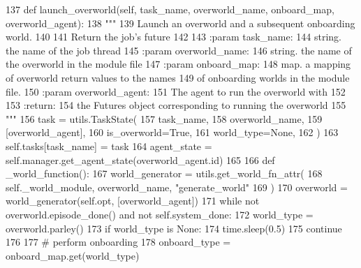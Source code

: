 \begin{DoxyCode}
137     \textcolor{keyword}{def }launch\_overworld(self, task\_name, overworld\_name, onboard\_map, overworld\_agent):
138         \textcolor{stringliteral}{"""}
139 \textcolor{stringliteral}{        Launch an overworld and a subsequent onboarding world.}
140 \textcolor{stringliteral}{}
141 \textcolor{stringliteral}{        Return the job's future}
142 \textcolor{stringliteral}{}
143 \textcolor{stringliteral}{        :param task\_name:}
144 \textcolor{stringliteral}{            string. the name of the job thread}
145 \textcolor{stringliteral}{        :param overworld\_name:}
146 \textcolor{stringliteral}{            string. the name of the overworld in the module file}
147 \textcolor{stringliteral}{        :param onboard\_map:}
148 \textcolor{stringliteral}{            map. a mapping of overworld return values to the names}
149 \textcolor{stringliteral}{            of onboarding worlds in the module file.}
150 \textcolor{stringliteral}{        :param overworld\_agent:}
151 \textcolor{stringliteral}{            The agent to run the overworld with}
152 \textcolor{stringliteral}{}
153 \textcolor{stringliteral}{        :return:}
154 \textcolor{stringliteral}{            the Futures object corresponding to running the overworld}
155 \textcolor{stringliteral}{        """}
156         task = utils.TaskState(
157             task\_name,
158             overworld\_name,
159             [overworld\_agent],
160             is\_overworld=\textcolor{keyword}{True},
161             world\_type=\textcolor{keywordtype}{None},
162         )
163         self.tasks[task\_name] = task
164         agent\_state = self.manager.get\_agent\_state(overworld\_agent.id)
165 
166         \textcolor{keyword}{def }\_world\_function():
167             world\_generator = utils.get\_world\_fn\_attr(
168                 self.\_world\_module, overworld\_name, \textcolor{stringliteral}{"generate\_world"}
169             )
170             overworld = world\_generator(self.opt, [overworld\_agent])
171             \textcolor{keywordflow}{while} \textcolor{keywordflow}{not} overworld.episode\_done() \textcolor{keywordflow}{and} \textcolor{keywordflow}{not} self.system\_done:
172                 world\_type = overworld.parley()
173                 \textcolor{keywordflow}{if} world\_type \textcolor{keywordflow}{is} \textcolor{keywordtype}{None}:
174                     time.sleep(0.5)
175                     \textcolor{keywordflow}{continue}
176 
177                 \textcolor{comment}{# perform onboarding}
178                 onboard\_type = onboard\_map.get(world\_type)

\end{DoxyCode}
